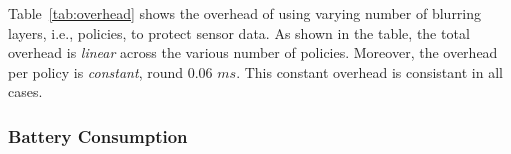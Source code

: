 Table~\ref{tab:overhead} shows the overhead of using varying number of 
blurring layers, i.e., policies, to protect sensor data. As shown in the table, 
the total overhead is \textit{linear} across the various number of policies. 
Moreover, the overhead per policy is \textit{constant}, round 0.06 $ms$. This 
constant overhead is consistant in all cases.

\subsubsection{Battery Consumption}

